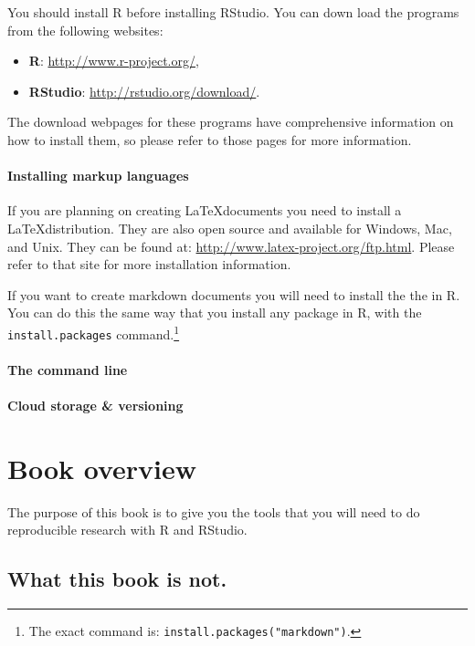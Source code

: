 \documentclass[ChapterTOCs,krantz1]{krantz}\usepackage{graphicx, color}
\begin{document}
You should install R before installing RStudio. You can down load the programs from the following websites:

\begin{itemize}
    \item {\bf{R}}: \url{http://www.r-project.org/},
    \item {\bf{RStudio}}: \url{http://rstudio.org/download/}.
\end{itemize}

\noindent The download webpages for these programs have comprehensive information on how to install them, so please refer to those pages for more information.

\paragraph{Installing markup languages}

If you are planning on creating \LaTeX documents you need to install a \LaTeX distribution. They are also open source and available for Windows, Mac, and Unix. They can be found at: \url{http://www.latex-project.org/ftp.html}. Please refer to that site for more installation information.

If you want to create markdown documents you will need to install the the  in R. You can do this the same way that you install any package in R, with the {\tt{install.packages}} command.\footnote{The exact command is: {\tt{install.packages("markdown")}}.} 

\paragraph{The command line}

\paragraph{Cloud storage \& versioning}

\section{Book overview}

The purpose of this book is to give you the tools that you will need to do reproducible research with R and RStudio. 

\subsection{What this book is not.}\label{WhatNot}
\end{document}
